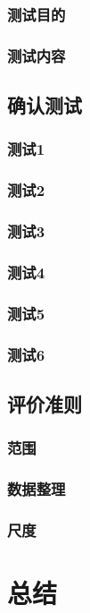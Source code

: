 \documentclass[
    report,     %
    oneside,    %
    UTF8,       %
    zihao=-4    %
]{config} %
\begin{document}
\subsection{测试目的}
\subsection{测试内容}
\section{确认测试}
\subsection{测试1}
\subsection{测试2}
\subsection{测试3}
\subsection{测试4}
\subsection{测试5}
\subsection{测试6}

\section{评价准则}
\subsection{范围}
\subsection{数据整理}
\subsection{尺度}
\chapter{总结}


\end{document}
